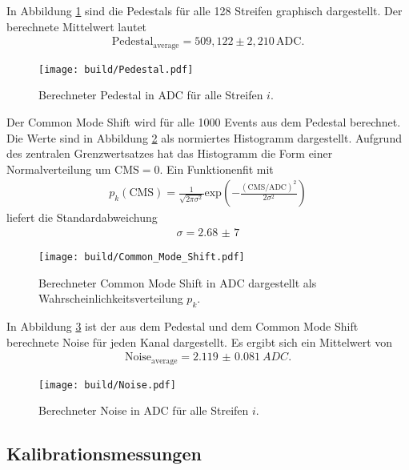 In Abbildung \ref{fig:pedestals} sind die Pedestals für alle 128 Streifen graphisch dargestellt.
Der berechnete Mittelwert lautet
\begin{align}
   \text{Pedestal}_\text{average} = 509,122 \pm 2,210 \, \text{ADC}.
\end{align}

\begin{figure}
  \centering
  \texttt{[image: build/Pedestal.pdf]}
  \caption{Berechneter Pedestal in ADC für alle Streifen $i$.}
  \label{fig:pedestals}
\end{figure}

Der Common Mode Shift wird für alle 1000 Events aus dem Pedestal berechnet.
Die Werte sind in Abbildung \ref{fig:cms} als normiertes Histogramm dargestellt.
Aufgrund des zentralen Grenzwertsatzes hat das Histogramm die Form einer Normalverteilung um $\text{CMS} = 0$.
Ein Funktionenfit mit
\begin{align}
  p_k(\text{CMS}) = \frac{1}{\sqrt{2 \pi \sigma^2}} \text{exp} \left(-\frac{(\text{CMS}/\text{ADC})^2}{2\sigma^2}\right)
  \label{eqn:gauß}
\end{align}
liefert die Standardabweichung
\begin{align}
  \sigma = \num{2,68(7)}
\end{align}

\begin{figure}
  \centering
  \texttt{[image: build/Common\_Mode\_Shift.pdf]}
  \caption{Berechneter Common Mode Shift in ADC dargestellt als Wahrscheinlichkeitsverteilung $p_k$.}
  \label{fig:cms}
\end{figure}

In Abbildung \ref{fig:noise} ist der aus dem Pedestal und dem Common Mode Shift berechnete Noise für jeden Kanal
dargestellt. Es ergibt sich ein Mittelwert von
\begin{align}
  \text{Noise}_\text{average} = \SI{2.119(81)}{ADC}.
\end{align}

\begin{figure}
  \centering
  \texttt{[image: build/Noise.pdf]}
  \caption{Berechneter Noise in ADC für alle Streifen $i$.}
  \label{fig:noise}
\end{figure}

\subsection{Kalibrationsmessungen}
\label{sec:kalibration}

